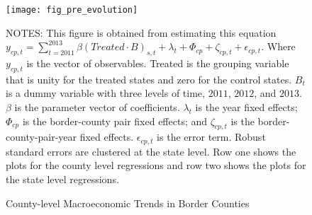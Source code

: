 \begin{figure}[H]
    \centering
    \texttt{[image: fig\_pre\_evolution]}
    \caption{County-level Macroeconomic Trends in Border Counties}
    \label{fig:county-level-macroeconomic-trends-in-border-counties}
    \begin{minipage}{18cm}
        \vspace{0.05in}
        {NOTES: This figure is obtained from estimating this equation $y_{cp,t} = \sum_{t = 2011}^{2013} \beta (Treated \cdot B)_{s,t} + \lambda_{t} + \Phi_{cp} + \zeta_{cp,t} + \epsilon_{cp,t}$. Where $y_{cp,t}$ is the vector of observables. Treated is the grouping variable that is unity for the treated states and zero for the control states. $B_{t}$ is a dummy variable with three levels of time, $2011$, $2012$, and $2013$. $\beta$ is the parameter vector of coefficients. $\lambda_{t}$ is the year fixed effects; $\Phi_{cp}$ is the border-county pair fixed effects; and $\zeta_{cp,t}$ is the border-county-pair-year fixed effects. $\epsilon_{cp,t}$ is the error term. Robust standard errors are clustered at the state level. Row one shows the plots for the county level regressions and row two shows the plots for the state level regressions. \par}
    \end{minipage}
\end{figure}